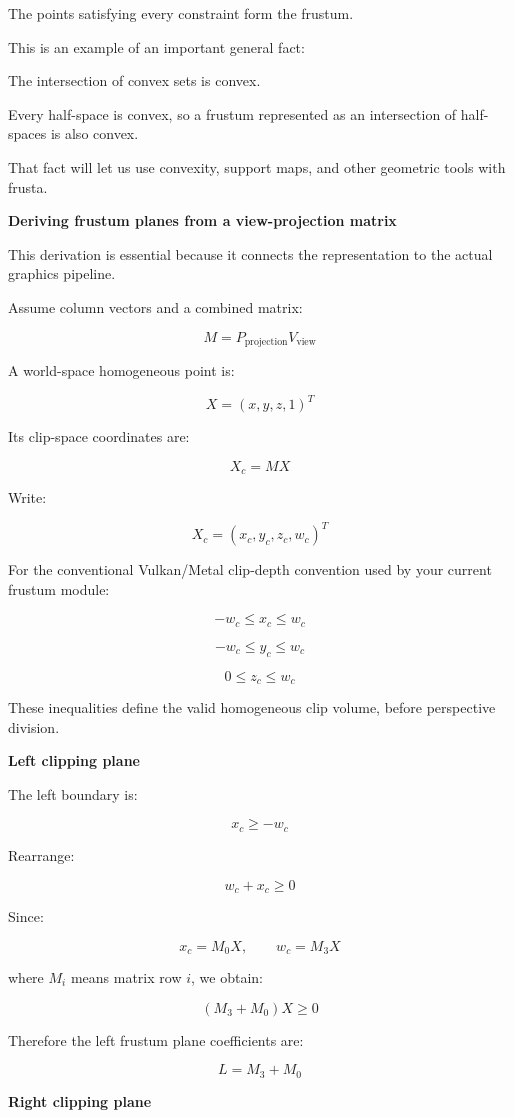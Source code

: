 The points satisfying every constraint form the frustum.

This is an example of an important general fact:

The intersection of convex sets is convex.

Every half-space is convex, so a frustum represented as an intersection of half-spaces is also convex.

That fact will let us use convexity, support maps, and other geometric tools with frusta.

\textbf{Deriving frustum planes from a view-projection matrix}

This derivation is essential because it connects the representation to the actual graphics pipeline.

Assume column vectors and a combined matrix:

\[
M=P_{\mathrm{projection}}V_{\mathrm{view}}
\]

A world-space homogeneous point is:

\[
X=(x,y,z,1)^T
\]

Its clip-space coordinates are:

\[
X_c=MX
\]

Write:

\[
X_c=(x_c,y_c,z_c,w_c)^T
\]

For the conventional Vulkan/Metal clip-depth convention used by your current frustum module:

\[
-w_c\le x_c\le w_c
\]

\[
-w_c\le y_c\le w_c
\]

\[
0\le z_c\le w_c
\]

These inequalities define the valid homogeneous clip volume, before perspective division.

\textbf{Left clipping plane}

The left boundary is:

\[
x_c\ge-w_c
\]

Rearrange:

\[
w_c+x_c\ge0
\]

Since:

\[
x_c=M_0X,\qquad w_c=M_3X
\]

where \(M_i\) means matrix row \(i\), we obtain:

\[
\boxed{ (M_3+M_0)X\ge0 }
\]

Therefore the left frustum plane coefficients are:

\[
\boxed{L=M_3+M_0}
\]

\textbf{Right clipping plane}

